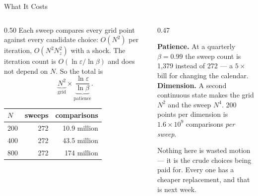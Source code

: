\begin{frame}{What It Costs}
\begin{columns}[T]
\begin{column}{0.50\textwidth}
\small
Each sweep compares every grid point against every candidate choice: $O(N^2)$ per iteration, $O(N^2 N_z^2)$ with a shock. The iteration count is $O(\ln\varepsilon/\ln\beta)$ and does not depend on $N$. So the total is
\[
  \underbrace{N^2}_{\text{grid}}\times\underbrace{\frac{\ln\varepsilon}{\ln\beta}}_{\text{patience}} .
\]
\begin{center}\footnotesize
\begin{tabular}{@{}lrr@{}}
\toprule
$N$ & sweeps & comparisons \\
\midrule
200 & 272 & 10.9 million \\
400 & 272 & 43.5 million \\
800 & 272 & 174 million \\
\bottomrule
\end{tabular}
\end{center}
\end{column}
\begin{column}{0.47\textwidth}
\begin{cautionbox}[title=\textbf{Two ways this becomes fatal}]\footnotesize
\textbf{Patience.} At a quarterly $\beta=0.99$ the sweep count is 1{,}379 instead of 272 --- a $5\times$ bill for changing the calendar.\\[1mm]
\textbf{Dimension.} A second continuous state makes the grid $N^2$ and the sweep $N^4$. 200 points per dimension is $1.6\times10^{9}$ comparisons \emph{per sweep}.
\end{cautionbox}
\medskip
\begin{examplebox}\footnotesize
Nothing here is wasted motion --- it is the crude choices being paid for. Every one has a cheaper replacement, and that is next week.
\end{examplebox}
\end{column}
\end{columns}
\vspace{1mm}
\end{frame}

